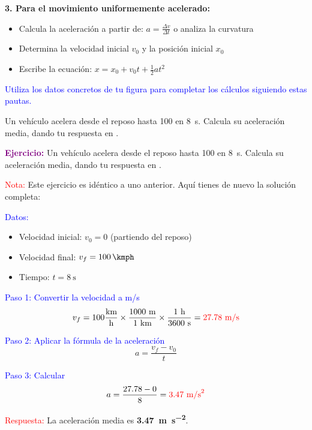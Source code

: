 \begin{exercise}
\begin{solu}
        \textbf{3. Para el movimiento uniformemente acelerado:}
        \begin{itemize}
            \item Calcula la aceleración a partir de: $a = \frac{\Delta v}{\Delta t}$ o analiza la curvatura
            \item Determina la velocidad inicial $v_0$ y la posición inicial $x_0$
            \item Escribe la ecuación: $x = x_0 + v_0 t + \frac{1}{2}at^2$
        \end{itemize}

        \textcolor{blue}{Utiliza los datos concretos de tu figura para completar los cálculos siguiendo estas pautas.}
    \end{solu}
\end{exercise}


\begin{exercise}
    Un vehículo acelera desde el reposo hasta \qty{100}{\kmph} en \qty{8}{\s}. Calcula su aceleración media, dando tu respuesta en \unit{\mpss}.

    \begin{solu}
        \textbf{\textcolor{purple}{Ejercicio:}} Un vehículo acelera desde el reposo hasta \qty{100}{\kmph} en \qty{8}{\s}. Calcula su aceleración media, dando tu respuesta en \unit{\mpss}.

        \vspace{0.3cm}

        \textcolor{red}{Nota:} Este ejercicio es idéntico a uno anterior. Aquí tienes de nuevo la solución completa:

        \textcolor{blue}{Datos:}
        \begin{itemize}
            \item Velocidad inicial: $v_0 = 0$ (partiendo del reposo)
            \item Velocidad final: $v_f = \qty{100}{\kmph}$
            \item Tiempo: $t = \qty{8}{\s}$
        \end{itemize}

        \textcolor{blue}{Paso 1: Convertir la velocidad a m/s}
        \[
            v_f = 100 \frac{\text{km}}{\text{h}} \times \frac{1000 \text{ m}}{1 \text{ km}} \times \frac{1 \text{ h}}{3600 \text{ s}} = \textcolor{red}{27.78 \text{ m/s}}
        \]

        \textcolor{blue}{Paso 2: Aplicar la fórmula de la aceleración}
        \[
            \boxed{a = \frac{v_f - v_0}{t}}
        \]

        \textcolor{blue}{Paso 3: Calcular}
        \[
            a = \frac{27.78 - 0}{8} = \textcolor{red}{3.47 \text{ m/s}^2}
        \]

        \textcolor{red}{Respuesta:} La aceleración media es \textbf{\qty{3.47}{\metre\per\second\squared}}.
    \end{solu}
\end{exercise}


